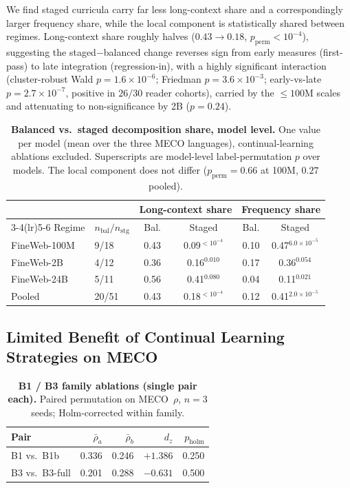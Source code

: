 We find staged curricula carry far less long-context share and a correspondingly larger frequency share, while the local component is statistically shared between regimes.  Long-context share roughly halves ($0.43\to0.18$, $p_\text{perm}{<}10^{-4}$),  suggesting the staged$-$balanced change reverses sign from early measures (first-pass) to late integration (regression-in), with a highly significant interaction (cluster-robust Wald $p{=}1.6{\times}10^{-6}$; Friedman $p{=}3.6{\times}10^{-3}$; early-vs-late $p{=}2.7{\times}10^{-7}$, positive in $26/30$ reader cohorts), carried by the ${\le}100$M scales and attenuating to non-significance by 2B ($p{=}0.24$).

\begin{table}[!ht]
  \centering \small
  \caption{\textbf{Balanced vs.\ staged decomposition share, model level.} One
  value per model (mean over the three MECO languages), continual-learning
  ablations excluded. Superscripts are model-level label-permutation $p$ over
  models. The local component does not differ ($p_\text{perm}{=}0.66$ at 100M,
  $0.27$ pooled).}
  \label{tab:sig_decomp_curriculum}
  \begin{tabular}{llcccc}
    \toprule
     & & \multicolumn{2}{c}{Long-context share} & \multicolumn{2}{c}{Frequency share} \\
    \cmidrule(lr){3-4}\cmidrule(lr){5-6}
    Regime & $n_{\text{bal}}/n_{\text{stg}}$ & Bal. & Staged & Bal. & Staged \\
    \midrule
    FineWeb-100M & 9/18  & 0.43 & 0.09${}^{<10^{-4}}$ & 0.10 & 0.47${}^{6.0\times10^{-5}}$ \\
    FineWeb-2B   & 4/12  & 0.36 & 0.16${}^{0.010}$    & 0.17 & 0.36${}^{0.054}$ \\
    FineWeb-24B  & 5/11  & 0.56 & 0.41${}^{0.080}$    & 0.04 & 0.11${}^{0.021}$ \\
    Pooled       & 20/51 & 0.43 & 0.18${}^{<10^{-4}}$ & 0.12 & 0.41${}^{2.0\times10^{-5}}$ \\
    \bottomrule
  \end{tabular}
\end{table}

\subsection{Limited Benefit of Continual Learning Strategies on MECO}

\begin{table}[!ht]
  \centering \small
  \caption{\textbf{B1 / B3 family ablations (single pair each).} Paired
  permutation on MECO~$\rho$, $n{=}3$ seeds; Holm-corrected within family.}
  \label{tab:sig_B1}
  \begin{tabular}{lrrrr}
    \toprule
    Pair & $\bar\rho_a$ & $\bar\rho_b$ & $d_z$ & $p_{\mathrm{holm}}$ \\
    \midrule
    B1 vs.\ B1b     & 0.336 & 0.246 & $+1.386$ & 0.250 \\
    B3 vs.\ B3-full & 0.201 & 0.288 & $-0.631$ & 0.500 \\
    \bottomrule
  \end{tabular}
\end{table}

